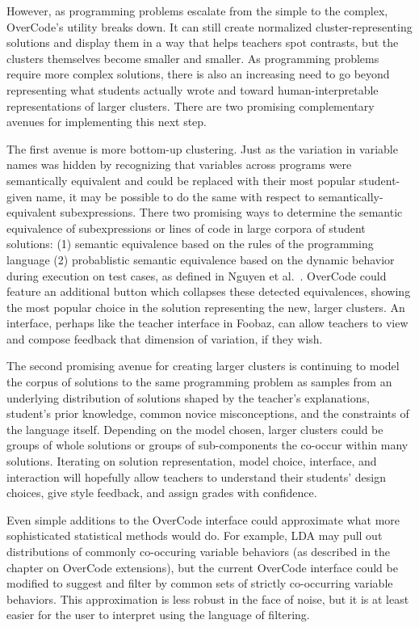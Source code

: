 However, as programming problems escalate from the simple to the complex, OverCode's utility breaks down. It can still create normalized cluster-representing solutions and display them in a way that helps teachers spot contrasts, but the clusters themselves become smaller and smaller. As programming problems require more complex solutions, there is also an increasing need to go beyond representing what students actually wrote and toward human-interpretable representations of larger clusters. There are two promising complementary avenues for implementing this next step.

The first avenue is more bottom-up clustering. Just as the variation in variable names was hidden by recognizing that variables across programs were semantically equivalent and could be replaced with their most popular student-given name, it may be possible to do the same with respect to semantically-equivalent subexpressions. There two promising ways to determine the semantic equivalence of subexpressions or lines of code in large corpora of student solutions: (1) semantic equivalence based on the rules of the programming language (2) probablistic semantic equivalence based on the dynamic behavior during execution on test cases, as defined in Nguyen et al.~\cite{codewebs}. OverCode could feature an additional button which collapses these detected equivalences, showing the most popular choice in the solution representing the new, larger clusters. An interface, perhaps like the teacher interface in Foobaz, can allow teachers to view and compose feedback that dimension of variation, if they wish. 

The second promising avenue for creating larger clusters is continuing to model the corpus of solutions to the same programming problem as samples from an underlying distribution of solutions shaped by the teacher's explanations, student's prior knowledge, common novice misconceptions, and the constraints of the language itself. Depending on the model chosen, larger clusters could be groups of whole solutions or groups of sub-components the co-occur within many solutions. Iterating on solution representation, model choice, interface, and interaction will hopefully allow teachers to understand their students' design choices, give style feedback, and assign grades with confidence. 

Even simple additions to the OverCode interface could approximate what more sophisticated statistical methods would do. For example, LDA may pull out distributions of commonly co-occuring variable behaviors (as described in the chapter on OverCode extensions), but the current OverCode interface could be modified to suggest and filter by common sets of strictly co-occurring variable behaviors. This approximation is less robust in the face of noise, but it is at least easier for the user to interpret using the language of filtering. %

